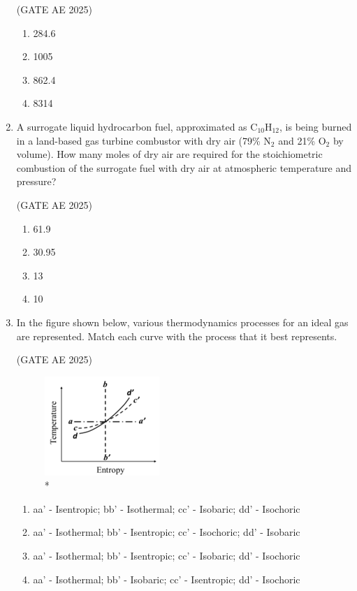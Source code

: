 \documentclass[journal,12pt,onecolumn]{IEEEtran}
\theoremstyle{remark}
\begin{document}
\begin{flushleft}
\begin{enumerate}
\hfill (GATE AE 2025)

\begin{enumerate}
    \item 284.6
    \item 1005
    \item 862.4
    \item 8314
\end{enumerate}
   
\item A surrogate liquid hydrocarbon fuel, approximated as C$_{10}$H$_{12}$, is being burned in a land-based gas turbine combustor with dry air (79\% N$_2$ and 21\% O$_2$ by volume). How many moles of dry air are required for the stoichiometric combustion of the surrogate fuel with dry air at atmospheric temperature and pressure?

\hfill (GATE AE 2025)

\begin{enumerate}
    \item 61.9
    \item 30.95
    \item 13
    \item 10
\end{enumerate}

\item In the figure shown below, various thermodynamics processes for an ideal gas are represented. Match each curve with the process that it best represents.

\hfill (GATE AE 2025)

\begin{figure}[H]
\includegraphics[width=0.5\columnwidth]{figs/entropy.png}
\caption{*}
    \label{fig:placeholder}
\end{figure}

\begin{enumerate}
    \item aa' - Isentropic; bb' - Isothermal; cc' - Isobaric; dd' - Isochoric
    \item aa' - Isothermal; bb' - Isentropic; cc' - Isochoric; dd' - Isobaric
    \item aa' - Isothermal; bb' - Isentropic; cc' - Isobaric; dd' - Isochoric
    \item aa' - Isothermal; bb' - Isobaric; cc' - Isentropic; dd' - Isochoric
\end{enumerate}
    

\end{enumerate}
\end{flushleft}
\end{document}
